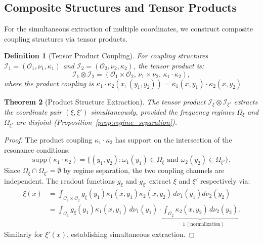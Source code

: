 \documentclass[twocolumn,10pt,a4paper]{article}
\newtheorem{theorem}{Theorem}[section]
\newtheorem{definition}[theorem]{Definition}
\theoremstyle{remark}
\newcommand{\oscillator}{\mathcal{O}}
\begin{document}
\subsection{Composite Structures and Tensor Products}

For the simultaneous extraction of multiple coordinates, we construct composite coupling structures via tensor products.

\begin{definition}[Tensor Product Coupling]
\label{def:tensor_product}
For coupling structures $\mathcal{I}_1 = (\oscillator_1, \nu_1, \kappa_1)$ and $\mathcal{I}_2 = (\oscillator_2, \nu_2, \kappa_2)$, the \emph{tensor product} is:
\begin{equation}
\mathcal{I}_1 \otimes \mathcal{I}_2 = (\oscillator_1 \times \oscillator_2, \, \nu_1 \times \nu_2, \, \kappa_1 \cdot \kappa_2),
\end{equation}
where the product coupling is $\kappa_1 \cdot \kappa_2(x, (y_1, y_2)) = \kappa_1(x, y_1) \cdot \kappa_2(x, y_2)$.
\end{definition}

\begin{theorem}[Product Structure Extraction]
\label{thm:product_extraction}
The tensor product $\mathcal{I}_\xi \otimes \mathcal{I}_{\xi'}$ extracts the coordinate pair $(\xi, \xi')$ simultaneously, provided the frequency regimes $\Omega_\xi$ and $\Omega_{\xi'}$ are disjoint (Proposition~\ref{prop:regime_separation}).
\end{theorem}

\begin{proof}
The product coupling $\kappa_1 \cdot \kappa_2$ has support on the intersection of the resonance conditions:
\begin{equation}
\text{supp}(\kappa_1 \cdot \kappa_2) = \{(y_1, y_2) : \omega_1(y_1) \in \Omega_\xi \text{ and } \omega_2(y_2) \in \Omega_{\xi'}\}.
\end{equation}
Since $\Omega_\xi \cap \Omega_{\xi'} = \emptyset$ by regime separation, the two coupling channels are independent. The readout functions $g_\xi$ and $g_{\xi'}$ extract $\xi$ and $\xi'$ respectively via:
\begin{align}
\xi(x) &= \int_{\oscillator_1 \times \oscillator_2} g_\xi(y_1) \kappa_1(x, y_1) \kappa_2(x, y_2) \, d\nu_1(y_1) d\nu_2(y_2) \\
&= \int_{\oscillator_1} g_\xi(y_1) \kappa_1(x, y_1) \, d\nu_1(y_1) \cdot \underbrace{\int_{\oscillator_2} \kappa_2(x, y_2) \, d\nu_2(y_2)}_{= 1 \, (\text{normalization})}.
\end{align}
Similarly for $\xi'(x)$, establishing simultaneous extraction.
\end{proof}
\end{document}
